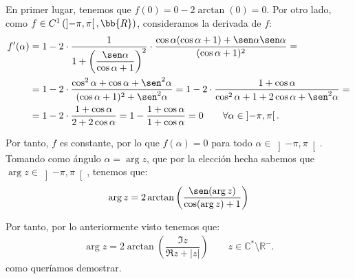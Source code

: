 \begin{ejercicio}
    En primer lugar, tenemos que $f(0)=0-2\arctan(0)=0$. Por otro lado, como $f\in C^1\left(\left]-\pi,\pi\right[,\bb{R}\right)$, consideramos la derivada de $f$:
    \begin{align*}
        f'(\alpha) &= 1 - 2\cdot \dfrac{1}{1+\left(\dfrac{\sen\alpha}{\cos\alpha + 1}\right)^2}\cdot \dfrac{\cos\alpha(\cos\alpha + 1) + \sen\alpha\sen\alpha}{(\cos\alpha + 1)^2} =\\&=
        1-2\cdot \dfrac{\cos^2\alpha+\cos\alpha+\sen^2\alpha}{(\cos\alpha + 1)^2+\sen^2\alpha}=
        1-2\cdot \dfrac{1+\cos\alpha}{\cos^2\alpha + 1+2\cos\alpha+\sen^2\alpha}
        =\\&=
        1-2\cdot \dfrac{1+\cos\alpha}{2+2\cos\alpha}
        = 1- \dfrac{1+\cos\alpha}{1+\cos\alpha} = 0\qquad \forall \alpha\in \left]-\pi,\pi\right[.
    \end{align*}



    Por tanto, $f$ es constante, por lo que $f(\alpha)=0$ para todo $\alpha\in \left]-\pi,\pi\right[$. Tomando como ángulo $\alpha=\arg z$, que por la elección hecha sabemos que $\arg z \in \left]-\pi,\pi\right[$, tenemos que: 
    \begin{equation*}
        \arg z = 2\arctan\left(\dfrac{\sen(\arg z)}{\cos(\arg z) + 1}\right)
    \end{equation*}

    Por tanto, por lo anteriormente visto tenemos que:
    \begin{align*}
        \arg z = 2\arctan\left(\dfrac{\Im z}{\Re z + |z|}\right)\qquad z\in \mathbb{C}^\ast \setminus \mathbb{R}^-.
    \end{align*}
    como queríamos demostrar.
\end{ejercicio}

